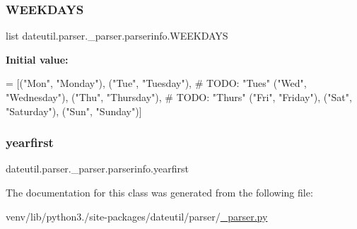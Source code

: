 \subsubsection{\texorpdfstring{W\+E\+E\+K\+D\+A\+YS}{WEEKDAYS}}
{\footnotesize\ttfamily list dateutil.\+parser.\+\_\+parser.\+parserinfo.\+W\+E\+E\+K\+D\+A\+YS\hspace{0.3cm}{\ttfamily [static]}}

{\bfseries Initial value\+:}
\begin{DoxyCode}
=  [(\textcolor{stringliteral}{"Mon"}, \textcolor{stringliteral}{"Monday"}),
                (\textcolor{stringliteral}{"Tue"}, \textcolor{stringliteral}{"Tuesday"}),     \textcolor{comment}{# TODO: "Tues"}
                (\textcolor{stringliteral}{"Wed"}, \textcolor{stringliteral}{"Wednesday"}),
                (\textcolor{stringliteral}{"Thu"}, \textcolor{stringliteral}{"Thursday"}),    \textcolor{comment}{# TODO: "Thurs"}
                (\textcolor{stringliteral}{"Fri"}, \textcolor{stringliteral}{"Friday"}),
                (\textcolor{stringliteral}{"Sat"}, \textcolor{stringliteral}{"Saturday"}),
                (\textcolor{stringliteral}{"Sun"}, \textcolor{stringliteral}{"Sunday"})]
\end{DoxyCode}
\mbox{\label{classdateutil_1_1parser_1_1__parser_1_1parserinfo_a7b45a99d2a9e4048daba50d1dec994b9}} 
\subsubsection{\texorpdfstring{yearfirst}{yearfirst}}
{\footnotesize\ttfamily dateutil.\+parser.\+\_\+parser.\+parserinfo.\+yearfirst}



The documentation for this class was generated from the following file\+:\begin{DoxyCompactItemize}
\item 
venv/lib/python3./site-\/packages/dateutil/parser/\hyperlink{dateutil_2parser_2__parser_8py}{\+\_\+parser.\+py}\end{DoxyCompactItemize}
